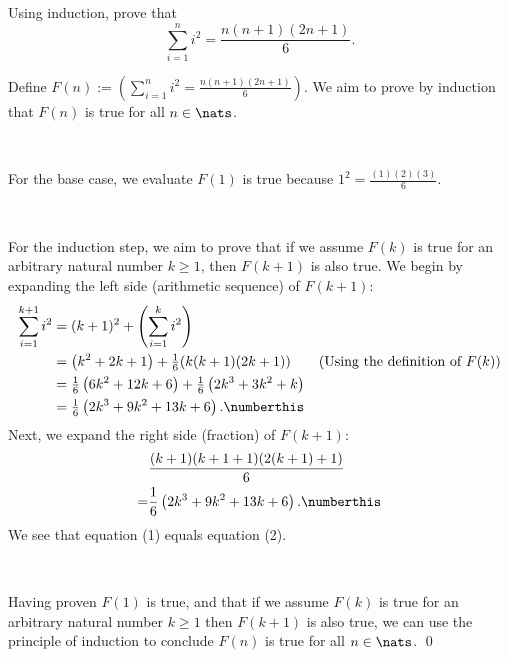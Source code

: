 \documentclass{article}
\begin{document}
\section{}

\begin{problem*}
    Using induction, prove that \[\sum_{i=1}^n i^2=\frac{n(n+1)(2n+1)}{6}.\]
\end{problem*}

Define $F(n):= \left( \sum_{i=1}^n i^2=\frac{n(n+1)(2n+1)}{6} \right)$. We aim to prove by induction that $F(n)$ is true for all $n \in \nats$.

\

For the base case, we evaluate $F(1)$ is true because $1^2=\tfrac{(1)(2)(3)}{6}$.

\

For the induction step, we aim to prove that if we assume $F(k)$ is true for an arbitrary natural number $k \geq 1$, then $F(k+1)$ is also true. 
We begin by expanding the left side (arithmetic sequence) of $F(k+1)$:
\begin{align*}
    \sum_{i=1}^{k+1} i^{2} &=(k+1)^{2}+\left(\sum_{i=1}^{k} i^{2}\right) \\
    &=\left(k^{2}+2 k+1\right)+\tfrac{1}{6}(k(k+1)(2 k+1)) \quad \quad (\textrm{Using the definition of } F(k)) \\
    &=\tfrac{1}{6}\left(6 k^{2}+12 k+6\right)+\tfrac{1}{6}\left(2 k^{3}+3 k^{2}+k\right) \\
    &=\tfrac{1}{6}\left(2 k^{3}+9 k^{2}+13 k+6\right). \numberthis
\end{align*}
Next, we expand the right side (fraction) of $F(k+1)$:
\begin{align*} 
    & \frac{(k+1)(k+1+1)(2(k+1)+1)}{6} \\
    =& \frac{1}{6}\left(2 k^{3}+9 k^{2}+13 k+6\right). \numberthis
\end{align*}
We see that equation (1) equals equation (2).

\

Having proven $F(1)$ is true, and that if we assume $F(k)$ is true for an arbitrary natural number $k \geq 1$ then $F(k+1)$ is also true, we can use the principle of induction to conclude $F(n)$ is true for all $n \in \nats$. \qed
\end{document}
